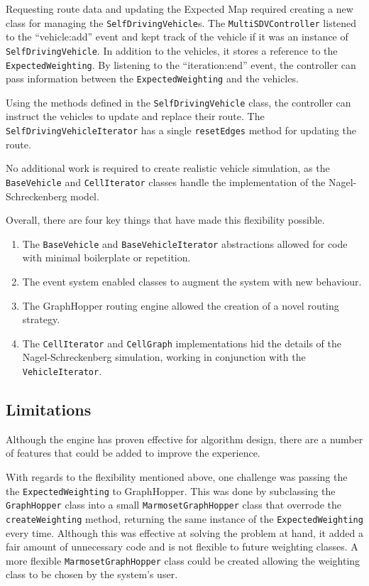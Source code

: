 \documentclass[ %
                    author={Alexander Hill},
                supervisor={Dr. Benjamin Sach},
                    degree={MEng},
                     title={MARMOSET},
                  subtitle={Multi-Agent Route Management using Online Simulation for Efficient Transportation},
                      type={research},
                      year={2016} ]{dissertation}
\begin{document}
Requesting route data and updating the Expected Map required creating a new
class for managing the \texttt{SelfDrivingVehicle}s. The
\texttt{MultiSDVController} listened to the ``vehicle:add'' event and kept track
of the vehicle if it was an instance of \texttt{SelfDrivingVehicle}. In addition
to the vehicles, it stores a reference to the \texttt{ExpectedWeighting}. By
listening to the ``iteration:end'' event, the controller can pass information
between the \texttt{ExpectedWeighting} and the vehicles.

Using the methods defined in the \texttt{SelfDrivingVehicle} class, the
controller can instruct the vehicles to update and replace their route. The
\texttt{SelfDrivingVehicleIterator} has a single \texttt{resetEdges} method for
updating the route.

No additional work is required to create realistic vehicle simulation, as the
\texttt{BaseVehicle} and \texttt{CellIterator} classes handle the implementation
of the Nagel-Schreckenberg model.

Overall, there are four key things that have made this flexibility possible.

\begin{enumerate}
    \item The \texttt{BaseVehicle} and \texttt{BaseVehicleIterator} abstractions
        allowed for code with minimal boilerplate or repetition.
    \item The event system enabled classes to augment the system with new
        behaviour.
    \item The GraphHopper routing engine allowed the creation of a novel
        routing strategy.
    \item The \texttt{CellIterator} and \texttt{CellGraph} implementations
        hid the details of the Nagel-Schreckenberg simulation, working in
        conjunction with the \texttt{VehicleIterator}.
\end{enumerate}

\subsection{Limitations}

Although the engine has proven effective for algorithm design, there are a
number of features that could be added to improve the experience.

With regards to the flexibility mentioned above, one challenge was passing the
the \texttt{ExpectedWeighting} to GraphHopper. This was done by subclassing the
\texttt{GraphHopper} class into a small \texttt{MarmosetGraphHopper} class that
overrode the \texttt{createWeighting} method, returning the same instance of the
\texttt{ExpectedWeighting} every time. Although this was effective at solving
the problem at hand, it added a fair amount of unnecessary code and is not
flexible to future weighting classes. A more flexible
\texttt{MarmosetGraphHopper} class could be created allowing the weighting class
to be chosen by the system's user.
\end{document}
